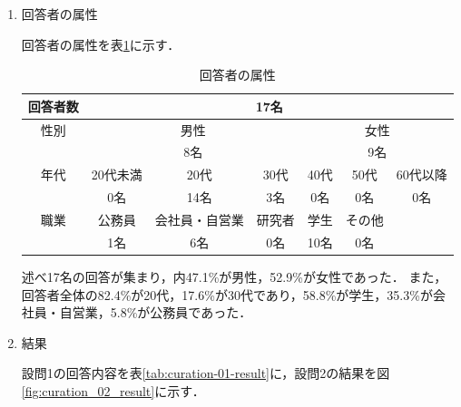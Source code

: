 \documentclass[a4paper]{jsarticle}
\begin{document}
\begin{enumerate}
\begin{enumerate}
\begin{enumerate}
  \item 回答者の属性

  回答者の属性を表\ref{tab:curation-userstatus}に示す．

  \begin{table}[H]
    \begin{center}
      \caption{回答者の属性}
      \renewcommand\arraystretch{1.4}
      \begin{tabular}{|c|c|c|c|c|c|c|}
        \hline
        \multicolumn{1}{|c|}{回答者数} & \multicolumn{6}{c|}{17名} \\
        \hline
        性別 & \multicolumn{3}{c|}{男性}　& \multicolumn{3}{c|}{女性} \\
        \cline{2-7}
        & \multicolumn{3}{c|}{8名}　& \multicolumn{3}{c|}{9名} \\
        \hline
        年代 & 20代未満 & 20代 & 30代 & 40代 & 50代 & 60代以降 \\
        \cline{2-7}
        & 0名 & 14名 & 3名 & 0名 & 0名 & 0名 \\
        \hline
        職業 & 公務員 & 会社員・自営業 & 研究者 & 学生 & その他 &  \\
        \cline{2-7}
        & 1名 & 6名 & 0名 & 10名 & 0名 & \\
        \hline
      \end{tabular}
      \label{tab:curation-userstatus}
    \end{center}
  \end{table}

  述べ17名の回答が集まり，内47.1\%が男性，52.9\%が女性であった．
  また，回答者全体の82.4\%が20代，17.6\%が30代であり，58.8\%が学生，35.3\%が会社員・自営業，5.8\%が公務員であった．

  \item 結果

  設問1の回答内容を表\ref{tab:curation-01-result}に，設問2の結果を図\ref{fig:curation_02_result}に示す．


\end{enumerate}
\end{enumerate}
\end{enumerate}
\end{document}
